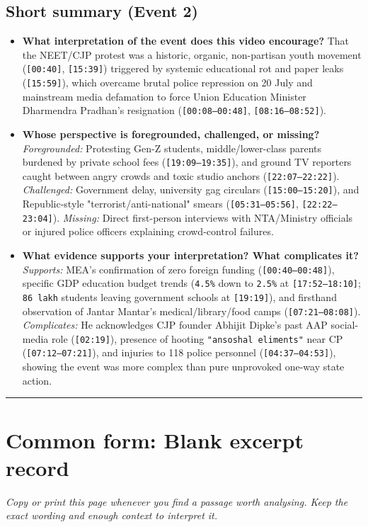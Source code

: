 \documentclass[10pt,a4paper]{article}
\begin{document}
\subsection*{Short summary (Event 2)}
\begin{itemize}[leftmargin=1.5em, itemsep=3pt, topsep=4pt]
  \item \textbf{What interpretation of the event does this video encourage?} That the NEET/CJP protest was a historic, organic, non-partisan youth movement (\texttt{[00:40]}, \texttt{[15:39]}) triggered by systemic educational rot and paper leaks (\texttt{[15:59]}), which overcame brutal police repression on 20 July and mainstream media defamation to force Union Education Minister Dharmendra Pradhan's resignation (\texttt{[00:08--00:48]}, \texttt{[08:16--08:52]}).
  \item \textbf{Whose perspective is foregrounded, challenged, or missing?} \textit{Foregrounded:} Protesting Gen-Z students, middle/lower-class parents burdened by private school fees (\texttt{[19:09--19:35]}), and ground TV reporters caught between angry crowds and toxic studio anchors (\texttt{[22:07--22:22]}). \textit{Challenged:} Government delay, university gag circulars (\texttt{[15:00--15:20]}), and Republic-style "terrorist/anti-national" smears (\texttt{[05:31--05:56]}, \texttt{[22:22--23:04]}). \textit{Missing:} Direct first-person interviews with NTA/Ministry officials or injured police officers explaining crowd-control failures.
  \item \textbf{What evidence supports your interpretation? What complicates it?} \textit{Supports:} MEA's confirmation of zero foreign funding (\texttt{[00:40--00:48]}), specific GDP education budget trends (\texttt{4.5\%} down to \texttt{2.5\%} at \texttt{[17:52--18:10]}; \texttt{86 lakh} students leaving government schools at \texttt{[19:19]}), and firsthand observation of Jantar Mantar's medical/library/food camps (\texttt{[07:21--08:08]}). \textit{Complicates:} He acknowledges CJP founder Abhijit Dipke's past AAP social-media role (\texttt{[02:19]}), presence of hooting \texttt{"ansoshal eliments"} near CP (\texttt{[07:12--07:21]}), and injuries to 118 police personnel (\texttt{[04:37--04:53]}), showing the event was more complex than pure unprovoked one-way state action.
\end{itemize}
\vspace{4pt}\noindent\rule{\textwidth}{0.4pt}\vspace{4pt}

\section*{Common form: Blank excerpt record}
\textit{Copy or print this page whenever you find a passage worth analysing. Keep the exact wording and enough context to interpret it.}
\end{document}
